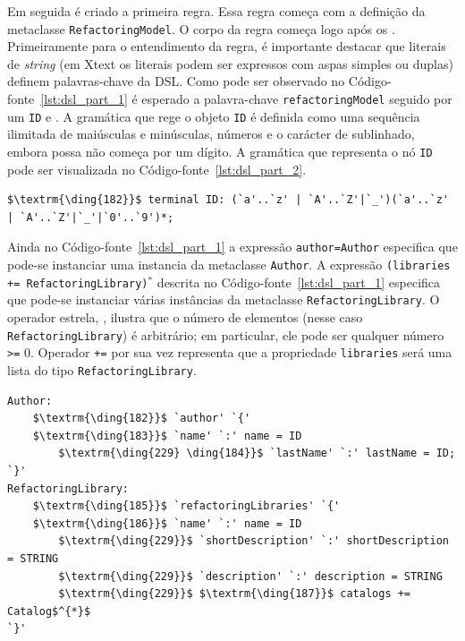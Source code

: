 Em seguida é criado a primeira regra. Essa regra começa com a definição da metaclasse \texttt{RefactoringModel}. O corpo da regra começa logo após os \aspas{\texttt{:}}. Primeiramente para o entendimento da regra, é importante destacar que literais de \textit{string} (em Xtext os literais podem ser expressos com aspas simples ou duplas) definem palavras-chave da DSL. Como pode ser observado no Código-fonte~\ref{lst:dsl_part_1} é esperado a palavra-chave \texttt{refactoringModel} seguido por um \texttt{ID} e \aspas{\{}. A gramática que rege o objeto \texttt{ID} é definida como uma sequência ilimitada de maiúsculas e minúsculas, números e o carácter de sublinhado, embora possa não começa por um dígito. A gramática que representa o nó \texttt{ID} pode ser visualizada no Código-fonte~\ref{lst:dsl_part_2}. 

\begin{lstlisting}[language=Xtext, frame=single, basicstyle=\scriptsize, mathescape=true, label={lst:dsl_part_2}, caption={Gramática da DSL - parte 2}]
	$\textrm{\ding{182}}$ terminal ID: (`a'..`z' | `A'..`Z'|`_')(`a'..`z' | `A'..`Z'|`_'|`0'..`9')*;
\end{lstlisting}

Ainda no Código-fonte~\ref{lst:dsl_part_1} a expressão \texttt{author=Author} especifica que pode-se instanciar uma instancia da metaclasse \texttt{Author}. A expressão \texttt{(libraries += RefactoringLibrary)$^{*}$} descrita no Código-fonte~\ref{lst:dsl_part_1} especifica que pode-se instanciar várias instâncias da metaclasse \texttt{RefactoringLibrary}. O operador estrela, \aspas{\texttt{*}}, ilustra que o número de elementos (nesse caso \texttt{RefactoringLibrary}) é arbitrário; em particular, ele pode ser qualquer número \texttt{>=} 0. Operador \texttt{+=} por sua vez representa que a propriedade \texttt{libraries} será uma lista do tipo \texttt{RefactoringLibrary}.

\begin{lstlisting}[language=Xtext, frame=single, basicstyle=\scriptsize, mathescape=true, label={lst:dsl_part_3}, caption={Gramática da DSL - parte 3}]
Author:
	$\textrm{\ding{182}}$ `author' `{'
	$\textrm{\ding{183}}$ `name' `:' name = ID  
		$\textrm{\ding{229} \ding{184}}$ `lastName' `:' lastName = ID; 
`}'
RefactoringLibrary:
	$\textrm{\ding{185}}$ `refactoringLibraries' `{'
	$\textrm{\ding{186}}$ `name' `:' name = ID  
		$\textrm{\ding{229}}$ `shortDescription' `:' shortDescription = STRING
		$\textrm{\ding{229}}$ `description' `:' description = STRING
		$\textrm{\ding{229}}$ $\textrm{\ding{187}}$ catalogs += Catalog$^{*}$
`}'
\end{lstlisting}


